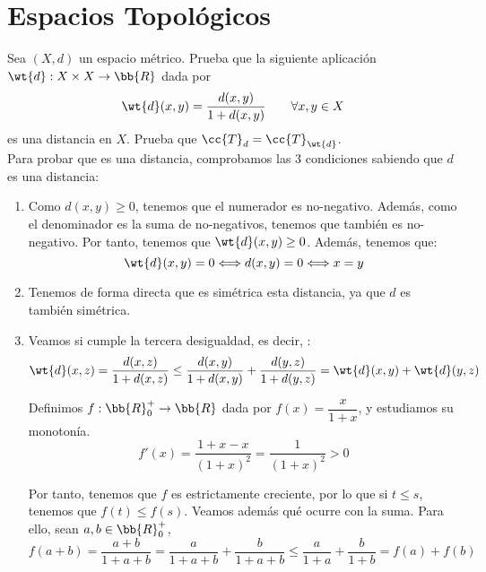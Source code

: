\section{Espacios Topológicos}\label{sec:Rel1}

\begin{ejercicio}
    Sea $(X,d)$ un espacio métrico. Prueba que la siguiente aplicación $\wt{d}:X\times X\to \bb{R}$ dada por
    \begin{equation*}
        \wt{d}(x,y)=\frac{d(x,y)}{1+d(x,y)} \qquad \forall x,y\in X
    \end{equation*}
    es una distancia en $X$. Prueba que $\cc{T}_d=\cc{T}_{\wt{d}}$.\\

    Para probar que es una distancia, comprobamos las 3 condiciones sabiendo que $d$ es una distancia:
    \begin{enumerate}
        \item Como $d(x,y)\geq 0$, tenemos que el numerador es no-negativo. Además, como el denominador es la suma de no-negativos, tenemos que también es no-negativo. Por tanto, tenemos que $\wt{d}(x,y)\geq 0$. Además, tenemos que:
        \begin{equation*}
            \wt{d}(x,y) = 0 \Longleftrightarrow d(x,y)=0 \Longleftrightarrow x=y
        \end{equation*}

        \item Tenemos de forma directa que es simétrica esta distancia, ya que $d$ es también simétrica.

        \item Veamos si cumple la tercera desigualdad, es decir, :
        \begin{equation*}
            \wt{d}(x,z) = \frac{d(x,z)}{1+d(x,z)} \leq \frac{d(x,y)}{1+d(x,y)} + \frac{d(y,z)}{1+d(y,z)} = \wt{d}(x,y) + \wt{d}(y,z)
        \end{equation*}

        Definimos $f:\bb{R}^+_0\to \bb{R}$ dada por $f(x)=\dfrac{x}{1+x}$, y estudiamos su monotonía.
        $$f'(x)=\frac{1+x -x}{(1+x)^2} = \frac{1}{(1+x)^2}>0$$
        
        Por tanto, tenemos que $f$ es estrictamente creciente, por lo que si $t\leq s$, tenemos que $f(t)\leq f(s)$. Veamos además qué ocurre con la suma. Para ello, sean $a,b\in \bb{R}^+_0$,
        \begin{equation*}
            f(a+b)=\frac{a+b}{1+a+b} = \frac{a}{1+a+b} + \frac{b}{1+a+b} \leq \frac{a}{1+a} + \frac{b}{1+b} = f(a)+f(b)
        \end{equation*}
        

\end{enumerate}
\end{ejercicio}
